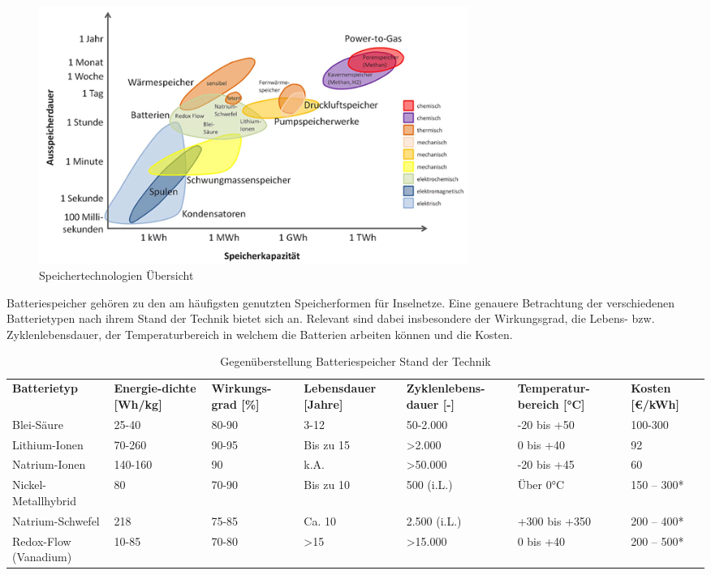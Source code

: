 \begin{figure}[h!]
    \centering
    \includegraphics[width=14cm]{Abbildungen/StandDerTechnikAbb3.png}
    \caption{Speichertechnologien Übersicht}\label{fig:Speichertechnologien_Übersicht}
\end{figure}
 
Batteriespeicher gehören zu den am häufigsten genutzten Speicherformen für Inselnetze. 
Eine genauere Betrachtung der verschiedenen Batterietypen nach ihrem Stand der Technik bietet sich an. 
Relevant sind dabei insbesondere der Wirkungsgrad, die Lebens- bzw. Zyklenlebensdauer, 
der Temperaturbereich in welchem die Batterien arbeiten können und die Kosten.


\begin{table}    
    \centering
    \caption{Gegenüberstellung Batteriespeicher Stand der Technik}
    \label{tab:Gegenüberstellung_Batteriespeicher_Stand_der_Technik}
    \begin{tabular}{p{2.2cm}|p{2.2cm}|p{2.2cm}|p{2.2cm}|p{2.2cm}|p{2.2cm}|p{2.2cm}|}
        \textbf{Batterietyp} & \textbf{Energie-dichte [Wh/kg]} & \textbf{Wirkungs-grad [\%]} & \textbf{Lebensdauer [Jahre]} & \textbf{Zyklenlebens-dauer [-]} & \textbf{Temperatur-bereich [°C]} & \textbf{Kosten [€/kWh]} \\
        Blei-Säure & 25-40 & 80-90 & 3-12 & 50-2.000 & -20 bis +50 & 100-300 \\
        Lithium-Ionen & 70-260 & 90-95 & Bis zu 15 & >2.000 & 0 bis +40 & 92 \\
        Natrium-Ionen & 140-160 & 90 & k.A. & >50.000 & -20 bis +45 & 60\cite{energieexperten} \\
        Nickel-Metallhybrid & 80 & 70-90 & Bis zu 10 & 500 (i.L.) & Über 0°C & 150 – 300* \\
        Natrium-Schwefel & 218 & 75-85 & Ca. 10 & 2.500 (i.L.) & +300 bis +350 & 200 – 400* \\
        Redox-Flow (Vanadium) & 10-85 & 70-80 & >15 & >15.000 & 0 bis +40 & 200 – 500* \\
    \end{tabular}
\end{table}

